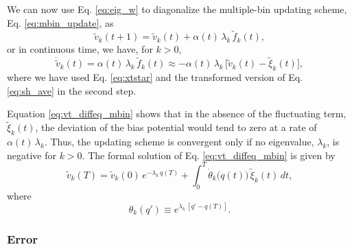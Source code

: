 \documentclass[reprint, superscriptaddress, floatfix]{revtex4-1}
\begin{document}
We can now use Eq. \eqref{eq:eig_w} to diagonalize
the multiple-bin updating scheme, Eq. \eqref{eq:mbin_update},
as
%
\begin{equation}
  {\tilde v}_k(t + 1) =
  {\tilde v}_k(t) + \alpha(t) \, \lambda_k \,
  {\tilde f}_k(t)
  ,
  \label{eq:vkupdate}
\end{equation}
%
or in continuous time, we have, for $k > 0$,
%
\begin{equation}
  \dot{\tilde v}_k(t)
  =
  \alpha(t) \, \lambda_k \, {\tilde f}_k(t)
  \approx
  -\alpha(t) \, \lambda_k \,
  \bigl[ {\tilde v}_k(t) - {\tilde \xi}_k(t) \bigr]
  ,
  \label{eq:vt_diffeq_mbin}
\end{equation}
%
where
we have used Eq. \eqref{eq:xtstar} and
the transformed version of Eq. \eqref{eq:sh_ave}
in the second step.

Equation \eqref{eq:vt_diffeq_mbin} shows that
in the absence of the fluctuating term, $\tilde \xi_k(t)$,
the deviation of the bias potential would tend to zero
at a rate of $\alpha(t) \, \lambda_k$.
%
Thus, the updating scheme is convergent
only if no eigenvalue, $\lambda_k$, is negative
for $k > 0$.
%
%
The formal solution of Eq. \eqref{eq:vt_diffeq_mbin}
is given by
\begin{equation}
  \tilde v_k(T)
  =
  \tilde v_k(0) \, e^{-\lambda_k \, q(T)}
  +
  \int_0^T
    \dot{\theta}_k\bigl( q(t) \bigr) \, \tilde\xi_k(t) \, dt
  ,
  \label{eq:vk_solution}
\end{equation}
where
\begin{equation}
  \theta_k(q') \equiv e^{\lambda_k \, [q' - q(T)]}
  .
  \label{eq:uk_def}
\end{equation}





\subsubsection{Error}
\end{document}
